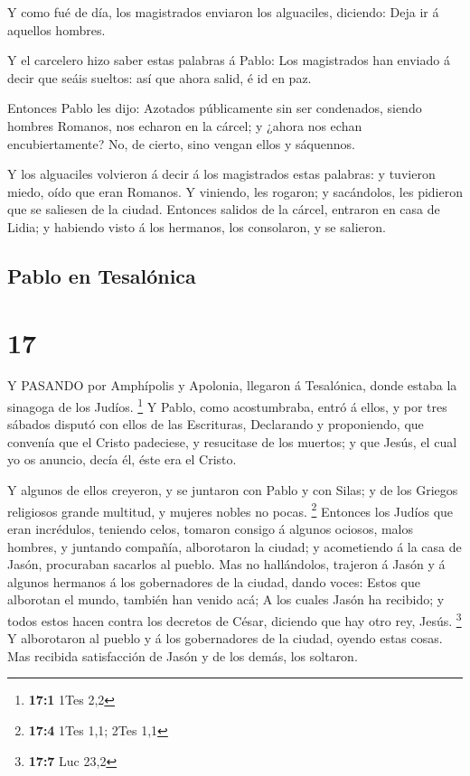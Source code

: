 Y como fué de día, los magistrados enviaron los
alguaciles, diciendo: Deja ir á aquellos hombres.

 Y el carcelero hizo saber estas palabras á Pablo: Los
magistrados han enviado á decir que seáis sueltos: así que ahora salid,
é id en paz.

 Entonces Pablo les dijo: Azotados públicamente sin ser
condenados, siendo hombres Romanos, nos echaron en la cárcel; y ¿ahora
nos echan encubiertamente? No, de cierto, sino vengan ellos y sáquennos.

 Y los alguaciles volvieron á decir á los magistrados estas
palabras: y tuvieron miedo, oído que eran Romanos.  Y
viniendo, les rogaron; y sacándolos, les pidieron que se saliesen de la
ciudad.  Entonces salidos de la cárcel, entraron en casa de
Lidia; y habiendo visto á los hermanos, los consolaron, y se salieron.

\hypertarget{pablo-en-tesaluxf3nica}{%
\subsection{Pablo en Tesalónica}\label{pablo-en-tesaluxf3nica}}

\hypertarget{section-16}{%
\section{17}\label{section-16}}

 Y PASANDO por Amphípolis y Apolonia, llegaron á Tesalónica,
donde estaba la sinagoga de los Judíos. \footnote{\textbf{17:1} 1Tes 2,2}
 Y Pablo, como acostumbraba, entró á ellos, y por tres
sábados disputó con ellos de las Escrituras,  Declarando y
proponiendo, que convenía que el Cristo padeciese, y resucitase de los
muertos; y que Jesús, el cual yo os anuncio, decía él, éste era el
Cristo.

 Y algunos de ellos creyeron, y se juntaron con Pablo y con
Silas; y de los Griegos religiosos grande multitud, y mujeres nobles no
pocas. \footnote{\textbf{17:4} 1Tes 1,1; 2Tes 1,1}  Entonces
los Judíos que eran incrédulos, teniendo celos, tomaron consigo á
algunos ociosos, malos hombres, y juntando compañía, alborotaron la
ciudad; y acometiendo á la casa de Jasón, procuraban sacarlos al pueblo.
 Mas no hallándolos, trajeron á Jasón y á algunos hermanos á
los gobernadores de la ciudad, dando voces: Estos que alborotan el
mundo, también han venido acá;  A los cuales Jasón ha
recibido; y todos estos hacen contra los decretos de César, diciendo que
hay otro rey, Jesús. \footnote{\textbf{17:7} Luc 23,2}  Y
alborotaron al pueblo y á los gobernadores de la ciudad, oyendo estas
cosas.  Mas recibida satisfacción de Jasón y de los demás,
los soltaron.


